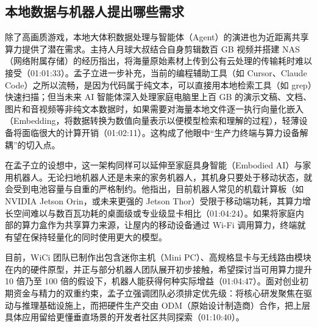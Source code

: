 \documentclass[UTF8,a4paper,11pt,fontset=fandol]{ctexart}
\begin{document}
\subsection{本地数据与机器人提出哪些需求}
除了高画质游戏，本地大体积数据处理与智能体（Agent）的演进也为近距离共享算力提供了潜在需求。主持人月球大叔结合自身剪辑数百 GB 视频并搭建 NAS（网络附属存储）的经历指出，将海量原始素材上传到公有云处理的传输耗时难以接受（01:01:33）。孟子立进一步补充，当前的编程辅助工具（如 Cursor、Claude Code）之所以流畅，是因为代码属于纯文本，可以直接用本地检索工具（如 grep）快速扫描；但当未来 AI 智能体深入处理家庭电脑里上百 GB 的演示文稿、文档、图片和音视频等非纯文本数据时，如果需要对海量本地文件逐一执行向量化嵌入（Embedding，将数据转换为数值向量表示以便模型检索和理解的过程），轻薄设备将面临很大的计算开销（01:02:11）。这构成了他眼中“生产力终端与算力设备解耦”的切入点。

在孟子立的设想中，这一架构同样可以延伸至家庭具身智能（Embodied AI）与家用机器人。无论扫地机器人还是未来的家务机器人，其机身只要处于移动状态，就会受到电池容量与自重的严格制约。他指出，目前机器人常见的机载计算板（如 NVIDIA Jetson Orin，或未来更强的 Jetson Thor）受限于移动端功耗，其算力增长空间难以与数百瓦功耗的桌面级或专业级显卡相比（01:04:24）。如果将家庭内部的算力盒作为共享算力来源，让屋内的移动设备通过 Wi-Fi 调用算力，终端就有望在保持轻量化的同时使用更大的模型。

目前，WiCi 团队已制作出包含迷你主机（Mini PC）、高规格显卡与无线路由模块在内的硬件原型，并正与部分机器人团队展开初步接触，希望探讨当可用算力提升 10 倍乃至 100 倍的假设下，机器人能获得何种实际增益（01:04:47）。面对创业初期资金与精力的双重约束，孟子立强调团队必须排定优先级：将核心研发聚焦在驱动与推理基础设施上，而把硬件生产交由 ODM（原始设计制造商）合作，把上层具体应用留给更懂垂直场景的开发者社区共同探索（01:10:40）。
\end{document}
